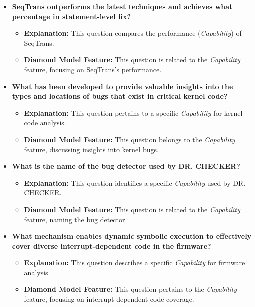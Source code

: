 \documentclass{article}
\begin{document}
\begin{itemize}
    \item \textbf{SeqTrans outperforms the latest techniques and achieves what percentage in statement-level fix?}
    \begin{itemize}
        \item \textbf{Explanation:} This question compares the performance (\textit{Capability}) of SeqTrans.
        \item \textbf{Diamond Model Feature:} This question is related to the \textit{Capability} feature, focusing on SeqTrans's performance.
    \end{itemize}

    \item \textbf{What has been developed to provide valuable insights into the types and locations of bugs that exist in critical kernel code?}
    \begin{itemize}
        \item \textbf{Explanation:} This question pertains to a specific \textit{Capability} for kernel code analysis.
        \item \textbf{Diamond Model Feature:} This question belongs to the \textit{Capability} feature, discussing insights into kernel bugs.
    \end{itemize}

    \item \textbf{What is the name of the bug detector used by DR. CHECKER?}
    \begin{itemize}
        \item \textbf{Explanation:} This question identifies a specific \textit{Capability} used by DR. CHECKER.
        \item \textbf{Diamond Model Feature:} This question is related to the \textit{Capability} feature, naming the bug detector.
    \end{itemize}

    \item \textbf{What mechanism enables dynamic symbolic execution to effectively cover diverse interrupt-dependent code in the firmware?}
    \begin{itemize}
        \item \textbf{Explanation:} This question describes a specific \textit{Capability} for firmware analysis.
        \item \textbf{Diamond Model Feature:} This question pertains to the \textit{Capability} feature, focusing on interrupt-dependent code coverage.
    \end{itemize}


\end{itemize}
\end{document}
